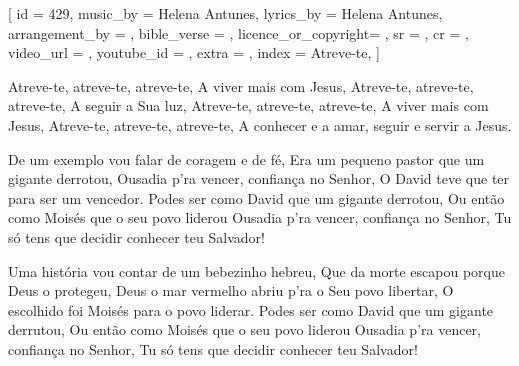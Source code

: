 [
    id                  = {429},
    music_by            = {Helena Antunes}, %
    lyrics_by           = {Helena Antunes}, %
    arrangement_by      = {}, %
    bible_verse         = {},
    licence_or_copyright= {},
    sr                  = {},
    cr                  = {},
    video_url           = {}, %
    youtube_id          = {}, %
    extra               = {},
    index               = {Atreve-te},
]

\beginchorus
Atreve-te, atreve-te, atreve-te, 
A viver mais com Jesus, 
Atreve-te, atreve-te, atreve-te, 
A seguir a Sua luz,
Atreve-te, atreve-te, atreve-te,
A viver mais com Jesus,
Atreve-te, atreve-te, atreve-te,
A conhecer e a amar, seguir e servir a Jesus.
\endchorus

\beginverse
De um exemplo vou falar de coragem e de fé,
Era um pequeno pastor que um gigante derrotou, 
Ousadia p’ra vencer, confiança no Senhor,
O David teve que ter para ser um vencedor.
Podes ser como David que um gigante derrotou, 
Ou então como Moisés que o seu povo liderou 
Ousadia p’ra vencer, confiança no Senhor,
Tu só tens que decidir conhecer teu Salvador!
\endverse

\beginverse
Uma história vou contar de um bebezinho hebreu, 
Que da morte escapou porque Deus o protegeu, 
Deus o mar vermelho abriu p’ra o Seu povo libertar, 
O escolhido foi Moisés para o povo liderar.
Podes ser como David que um gigante derrutou, 
Ou então como Moisés que o seu povo liderou 
Ousadia p’ra vencer, confiança no Senhor,
Tu só tens que decidir conhecer teu Salvador!
\endverse

\endsong
